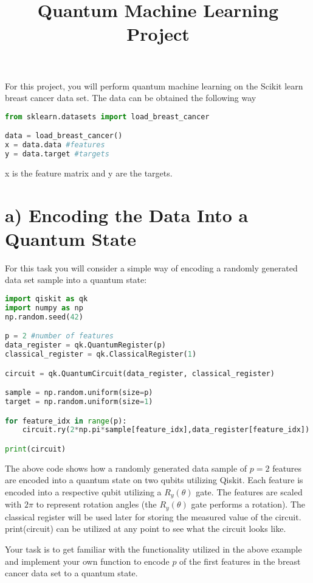 \documentclass[letterpaper,11pt]{article}
\begin{document}
\title{Quantum Machine Learning Project}
\maketitle


For this project, you will perform quantum machine learning on the Scikit learn breast cancer data set. The data can be obtained the following way
\begin{lstlisting}[language=Python]
from sklearn.datasets import load_breast_cancer

data = load_breast_cancer()
x = data.data #features
y = data.target #targets

\end{lstlisting}
x is the feature matrix and y are the targets.

\section*{a) Encoding the Data Into a Quantum State}
For this task you will consider a simple way of encoding a randomly generated data set sample into a quantum state:

\begin{lstlisting}[language=Python]
import qiskit as qk
import numpy as np
np.random.seed(42)

p = 2 #number of features
data_register = qk.QuantumRegister(p)
classical_register = qk.ClassicalRegister(1)

circuit = qk.QuantumCircuit(data_register, classical_register) 

sample = np.random.uniform(size=p)
target = np.random.uniform(size=1)

for feature_idx in range(p):
    circuit.ry(2*np.pi*sample[feature_idx],data_register[feature_idx])

print(circuit)
\end{lstlisting}
The above code shows how a randomly generated data sample of $p=2$ features are encoded into a quantum state on two qubits utilizing Qiskit. Each feature is encoded into a respective qubit utilizing a $R_y(\theta)$ gate. The features are scaled with $2\pi$ to represent rotation angles (the $R_y(\theta)$ gate performs a rotation). The classical register will be used later for storing the measured value of the circuit.  print(circuit) can be utilized at any point to see what the circuit looks like.

\bigskip

Your task is to get familiar with the functionality utilized in the above example and implement your own function to encode $p$ of the first features in the breast cancer data set to a quantum state.
\end{document}
